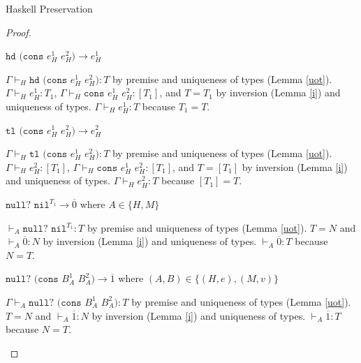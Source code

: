 \begin{theorem}{Haskell Preservation}
\begin{proof}

\begin{case}{\oshdconsh}

$\mathtt{hd}$ $(\mathtt{cons}$ $e_{H}^{1}$ $e_{H}^{2})\rightarrow e_{H}^{1}$

$\Gamma\vdash_{H}\mathtt{hd}$ $(\mathtt{cons}$ $e_{H}^{1}$ $e_{H}^{2}):T$ by premise and uniqueness of types (Lemma \ref{uot}).  $\Gamma\vdash_{H}e_{H}^{1}:T_{1}$, $\Gamma\vdash_{H}\mathtt{cons}$ $e_{H}^{1}$ $e_{H}^{2}:[T_{1}]$, and $T=T_{1}$ by inversion (Lemma \ref{i}) and uniqueness of types.  $\Gamma\vdash_{H}e_{H}^{1}:T$ because $T_{1}=T$.
\end{case}


\begin{case}{\ostlconsh}

$\mathtt{tl}$ $(\mathtt{cons}$ $e_{H}^{1}$ $e_{H}^{2})\rightarrow e_{H}^{2}$

$\Gamma\vdash_{H}\mathtt{tl}$ $(\mathtt{cons}$ $e_{H}^{1}$ $e_{H}^{2}):T$ by premise and uniqueness of types (Lemma \ref{uot}).  $\Gamma\vdash_{H}e_{H}^{2}:[T_{1}]$, $\Gamma\vdash_{H}\mathtt{cons}$ $e_{H}^{1}$ $e_{H}^{2}:[T_{1}]$, and $T=[T_{1}]$ by inversion (Lemma \ref{i}) and uniqueness of types.  $\Gamma\vdash_{H}e_{H}^{2}:T$ because $[T_{1}]=T$.
\end{case}


\begin{case}{\osnullnil}

$\mathtt{null?}$ $\mathtt{nil}^{T_{1}}\rightarrow\overline{0}$ where $A\in\lbrace H,M\rbrace$

$\vdash_{A}\mathtt{null?}$ $\mathtt{nil}^{T_{1}}:T$ by premise and uniqueness of types (Lemma \ref{uot}).  $T=N$ and $\vdash_{A}\overline{0}:N$ by inversion (Lemma \ref{i}) and uniqueness of types.  $\vdash_{A}\overline{0}:T$ because $N=T$.
\end{case}


\begin{case}{\osnullconsh}

$\mathtt{null?}$ $(\mathtt{cons}$ $B_{A}^{1}$ $B_{A}^{2})\rightarrow\overline{1}$ where $(A,B)\in\lbrace(H,e),(M,v)\rbrace$

$\Gamma\vdash_{A}\mathtt{null?}$ $(\mathtt{cons}$ $B_{A}^{1}$ $B_{A}^{2}):T$ by premise and uniqueness of types (Lemma \ref{uot}).  $T=N$ and $\vdash_{A}\overline{1}:N$ by inversion (Lemma \ref{i}) and uniqueness of types.  $\vdash_{A}\overline{1}:T$ because $N=T$.
\end{case}


\end{proof}
\end{theorem}

